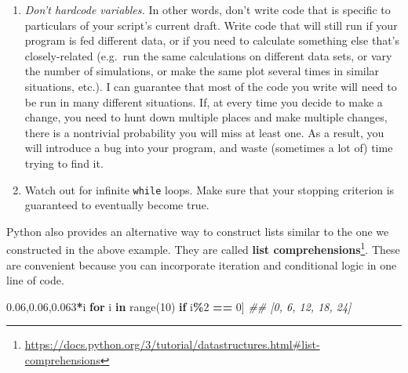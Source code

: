 \documentclass[
  12pt,
  krantz2]{krantz}
\makeatletter
\newenvironment{Shaded}{\begin{snugshade}}{\end{snugshade}}
\newcommand{\BuiltInTok}[1]{#1}
\newcommand{\CommentTok}[1]{\textcolor[rgb]{0.37,0.37,0.37}{\textit{#1}}}
\newcommand{\ControlFlowTok}[1]{\textcolor[rgb]{0.27,0.27,0.27}{\textbf{#1}}}
\newcommand{\DecValTok}[1]{\textcolor[rgb]{0.06,0.06,0.06}{#1}}
\newcommand{\KeywordTok}[1]{\textcolor[rgb]{0.27,0.27,0.27}{\textbf{#1}}}
\newcommand{\NormalTok}[1]{#1}
\newcommand{\OperatorTok}[1]{\textcolor[rgb]{0.43,0.43,0.43}{\textbf{#1}}}
\providecommand{\tightlist}{%
  \setlength{\itemsep}{0pt}\setlength{\parskip}{0pt}}
\renewcommand{\href}[2]{#2\footnote{\url{#1}}}
\newenvironment{kframe}{%
\medskip{}
\setlength{\fboxsep}{.8em}
 \def\at@end@of@kframe{}%
 \ifinner\ifhmode%
  \def\at@end@of@kframe{\end{minipage}}%
  \begin{minipage}{\columnwidth}%
 \fi\fi%
 \def\FrameCommand##1{\hskip\@totalleftmargin \hskip-\fboxsep
 \colorbox{shadecolor}{##1}\hskip-\fboxsep
     \hskip-\linewidth \hskip-\@totalleftmargin \hskip\columnwidth}%
 \MakeFramed {\advance\hsize-\width
   \@totalleftmargin\z@ \linewidth\hsize
   \@setminipage}}%
 {\par\unskip\endMakeFramed%
 \at@end@of@kframe}
\renewenvironment{Shaded}{\begin{kframe}}{\end{kframe}}
\makeatother
\begin{document}
\begin{rmd-caution}
\begin{enumerate}
  \begin{itemize}
  \tightlist
  \item
    Python starts counting from \(0\), while R starts counting from \(1\)
  \item
    sometimes iteration \texttt{i} references the \texttt{i-1}th element of a container
  \item
    The behavior of loops is sometimes more difficult to understand if they're using \href{https://cran.r-project.org/doc/manuals/r-release/R-lang.html\#Looping}{\texttt{break}} or \href{https://docs.python.org/3/tutorial/controlflow.html\#break-and-continue-statements-and-else-clauses-on-loops}{\texttt{continue}/\texttt{next} statements}.
  \end{itemize}
\item
  \emph{Don't hardcode variables.} In other words, don't write code that is specific to particulars of your script's current draft. Write code that will still run if your program is fed different data, or if you need to calculate something else that's closely-related (e.g.~run the same calculations on different data sets, or vary the number of simulations, or make the same plot several times in similar situations, etc.). I can guarantee that most of the code you write will need to be run in many different situations. If, at every time you decide to make a change, you need to hunt down multiple places and make multiple changes, there is a nontrivial probability you will miss at least one. As a result, you will introduce a bug into your program, and waste (sometimes a lot of) time trying to find it.
\item
  Watch out for infinite \texttt{while} loops. Make sure that your stopping criterion is guaranteed to eventually become true.
\end{enumerate}

\end{rmd-caution}

Python also provides an alternative way to construct lists similar to the one we constructed in the above example. They are called \href{https://docs.python.org/3/tutorial/datastructures.html\#list-comprehensions}{\textbf{list comprehensions}}. These are convenient because you can incorporate iteration and conditional logic in one line of code.

\begin{Shaded}
\begin{Highlighting}[]
\NormalTok{[}\DecValTok{3}\OperatorTok{*}\NormalTok{i }\ControlFlowTok{for}\NormalTok{ i }\KeywordTok{in} \BuiltInTok{range}\NormalTok{(}\DecValTok{10}\NormalTok{) }\ControlFlowTok{if}\NormalTok{ i}\OperatorTok{\%}\DecValTok{2} \OperatorTok{==} \DecValTok{0}\NormalTok{]}
\CommentTok{\#\# [0, 6, 12, 18, 24]}
\end{Highlighting}
\end{Shaded}
\end{document}
